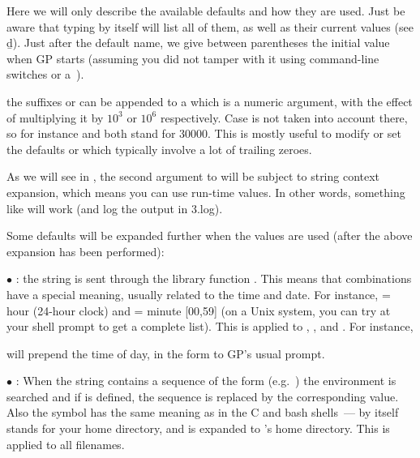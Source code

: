 Here we will only describe the available defaults and how they are used. Just
be aware that typing  by itself will list all of them, as well
as their current values (see \b{d}). Just after the default name, we give
between parentheses the initial value when GP starts (assuming you did not
tamper with it using command-line switches or a~).

 the suffixes  or  can be appended to a
 which is a numeric argument, with the effect of multiplying it
by $10^3$ or $10^6$ respectively. Case is not taken into account there, so
for instance  and  both stand for $30000$. This is mostly
useful to modify or set the defaults  or 
which typically involve a lot of trailing zeroes.

 As we will see in
, the second argument to  will be subject
to string context expansion, which means you can use run-time values. In
other words, something like  will work (and log the output in
3.log).

Some defaults will be expanded further when the values are used (after the
above expansion has been performed):

$\bullet$ : the string is sent through the library
function . This means that \kbd{\%} combinations have
a special meaning, usually related to the time and date. For instance,
 = hour (24-hour clock) and  = minute [00,59] (on a Unix
system, you can try  at your shell prompt to get a complete
list). This is applied to , , and . For
instance,


\noindent
will prepend the time of day, in the form 
to GP's usual prompt.

\unix \indent $\bullet$ : When the string contains a
sequence of the form  (e.g.~) the
environment is searched and if  is defined, the sequence is
replaced by the corresponding value. Also the \kbd{\til} symbol has the
same meaning as in the C and bash shells~--- \kbd{\til} by itself stands
for your home directory, and  is expanded to 's
home directory. This is applied to all filenames.

